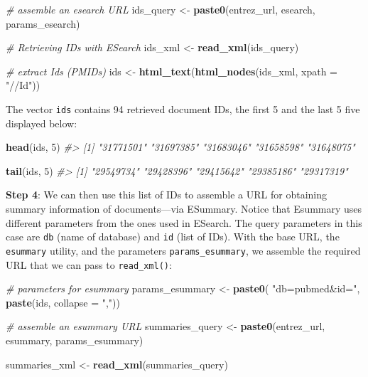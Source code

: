 \documentclass[
]{book}
\newenvironment{Shaded}{\begin{snugshade}}{\end{snugshade}}
\newcommand{\AttributeTok}[1]{\textcolor[rgb]{0.13,0.29,0.53}{#1}}
\newcommand{\CommentTok}[1]{\textcolor[rgb]{0.56,0.35,0.01}{\textit{#1}}}
\newcommand{\DecValTok}[1]{\textcolor[rgb]{0.00,0.00,0.81}{#1}}
\newcommand{\FunctionTok}[1]{\textcolor[rgb]{0.13,0.29,0.53}{\textbf{#1}}}
\newcommand{\NormalTok}[1]{#1}
\newcommand{\OtherTok}[1]{\textcolor[rgb]{0.56,0.35,0.01}{#1}}
\newcommand{\StringTok}[1]{\textcolor[rgb]{0.31,0.60,0.02}{#1}}
\begin{document}
\begin{Shaded}
\begin{Highlighting}[]
\CommentTok{\# assemble an esearch URL}
\NormalTok{ids\_query }\OtherTok{\textless{}{-}} \FunctionTok{paste0}\NormalTok{(entrez\_url, esearch, params\_esearch)}

\CommentTok{\# Retrieving IDs with ESearch}
\NormalTok{ids\_xml }\OtherTok{\textless{}{-}} \FunctionTok{read\_xml}\NormalTok{(ids\_query)}

\CommentTok{\# extract Ids (PMIDs)}
\NormalTok{ids }\OtherTok{\textless{}{-}} \FunctionTok{html\_text}\NormalTok{(}\FunctionTok{html\_nodes}\NormalTok{(ids\_xml, }\AttributeTok{xpath =} \StringTok{"//Id"}\NormalTok{))}
\end{Highlighting}
\end{Shaded}

The vector \texttt{ids} contains 94 retrieved document IDs, the first
5 and the last 5 five displayed below:

\begin{Shaded}
\begin{Highlighting}[]
\FunctionTok{head}\NormalTok{(ids, }\DecValTok{5}\NormalTok{)}
\CommentTok{\#\textgreater{} [1] "31771501" "31697385" "31683046" "31658598" "31648075"}

\FunctionTok{tail}\NormalTok{(ids, }\DecValTok{5}\NormalTok{)}
\CommentTok{\#\textgreater{} [1] "29549734" "29428396" "29415642" "29385186" "29317319"}
\end{Highlighting}
\end{Shaded}

\textbf{Step 4}: We can then use this list of IDs to assemble a URL for obtaining
summary information of documents---via ESummary. Notice that Esummary uses
different parameters from the ones used in ESearch. The query parameters in
this case are \texttt{db} (name of database) and \texttt{id} (list of IDs). With the base URL,
the \texttt{esummary} utility, and the parameters \texttt{params\_esummary}, we assemble the
required URL that we can pass to \texttt{read\_xml()}:

\begin{Shaded}
\begin{Highlighting}[]
\CommentTok{\# parameters for esummary}
\NormalTok{params\_esummary }\OtherTok{\textless{}{-}} \FunctionTok{paste0}\NormalTok{(}
  \StringTok{"db=pubmed\&id="}\NormalTok{, }
  \FunctionTok{paste}\NormalTok{(ids, }\AttributeTok{collapse =} \StringTok{","}\NormalTok{))}

\CommentTok{\# assemble an esummary URL}
\NormalTok{summaries\_query }\OtherTok{\textless{}{-}} \FunctionTok{paste0}\NormalTok{(entrez\_url, esummary, params\_esummary)}

\NormalTok{summaries\_xml }\OtherTok{\textless{}{-}} \FunctionTok{read\_xml}\NormalTok{(summaries\_query)}
\end{Highlighting}
\end{Shaded}
\end{document}
